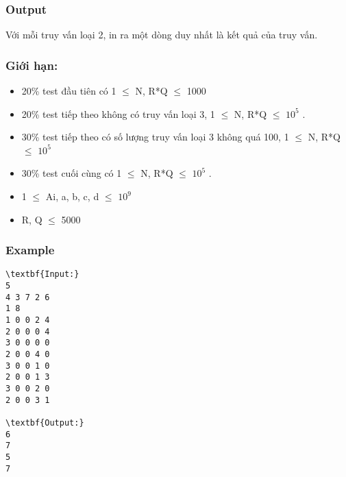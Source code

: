 \subsubsection{Output}

Với mỗi truy vấn loại 2, in ra một dòng duy nhất là kết quả của truy vấn.

\subsubsection{Giới hạn:}
\begin{itemize}
	\item 20\% test đầu tiên có 1  $\le$  N, R*Q  $\le$  1000
	\item 20\% test tiếp theo không có truy vấn loại 3, 1  $\le$  N, R*Q  $\le$  $10^{5}$ .
	\item 30\% test tiếp theo có số lượng truy vấn loại 3 không quá 100, 1  $\le$  N, R*Q  $\le$  $10^{5}$
	\item 30\% test cuối cùng có 1  $\le$  N, R*Q  $\le$  $10^{5}$ .
	\item 1  $\le$  Ai, a, b, c, d  $\le$  $10^{9}$
	\item R, Q  $\le$  5000
\end{itemize}

\subsubsection{Example}
\begin{verbatim}
\textbf{Input:}
5
4 3 7 2 6
1 8
1 0 0 2 4
2 0 0 0 4
3 0 0 0 0
2 0 0 4 0
3 0 0 1 0
2 0 0 1 3
3 0 0 2 0
2 0 0 3 1

\textbf{Output:}
6
7
5
7
\end{verbatim}
